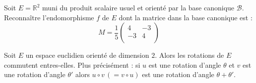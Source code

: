 \documentclass[french,11pt,twoside]{VcCours}
\begin{document}
\medskip

\begin{Exemple}{} Soit $E= \mathbb{R}^2$ muni du produit scalaire usuel et orienté par la base canonique $\mathcal{B}$. Reconnaître l'endomorphisme $f$ de $E$ dont la matrice dans la base canonique est :
$$ M =\dfrac{1}{5} \begin{pmatrix}
4 & -3 \\
-3 & 4\\
\end{pmatrix}$$

\vspace*{6cm}
\end{Exemple}

\begin{Proposition}{} Soit $E$ un espace euclidien orienté de dimension $2$. Alors les rotations de $E$ commutent entres-elles. Plus précisément : si $u$ est une rotation d'angle $\theta$ et $v$ est une rotation d'angle $\theta'$ alors $u \circ v \, (= v \circ u)$ est une rotation d'angle $\theta + \theta'$.
\end{Proposition}

\begin{Demonstration}{}
\vspace*{3cm}
\end{Demonstration}
\end{document}
